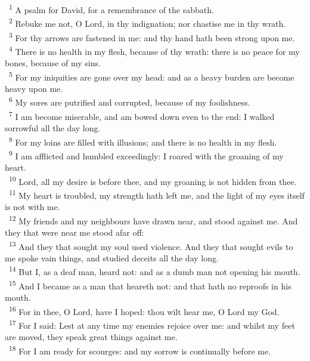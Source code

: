 \documentclass[a5paper,12pt]{article}
\begin{document}
\begin{multicols*}{2}
~\textsuperscript{1} A psalm for David, for a remembrance of the sabbath.\\
~\textsuperscript{2} Rebuke me not, O Lord, in thy indignation; nor chastise me in thy wrath.\\
~\textsuperscript{3} For thy arrows are fastened in me: and thy hand hath been strong upon me.\\
~\textsuperscript{4} There is no health in my flesh, because of thy wrath: there is no peace for my bones, because of my sins.\\
~\textsuperscript{5} For my iniquities are gone over my head: and as a heavy burden are become heavy upon me.\\
~\textsuperscript{6} My sores are putrified and corrupted, because of my foolishness.\\
~\textsuperscript{7} I am become miserable, and am bowed down even to the end: I walked sorrowful all the day long.\\
~\textsuperscript{8} For my loins are filled with illusions; and there is no health in my flesh.\\
~\textsuperscript{9} I am afflicted and humbled exceedingly: I roared with the groaning of my heart.\\
~\textsuperscript{10} Lord, all my desire is before thee, and my groaning is not hidden from thee.\\
~\textsuperscript{11} My heart is troubled, my strength hath left me, and the light of my eyes itself is not with me.\\
~\textsuperscript{12} My friends and my neighbours have drawn near, and stood against me. And they that were near me stood afar off:\\
~\textsuperscript{13} And they that sought my soul used violence. And they that sought evils to me spoke vain things, and studied deceits all the day long.\\
~\textsuperscript{14} But I, as a deaf man, heard not: and as a dumb man not opening his mouth.\\
~\textsuperscript{15} And I became as a man that heareth not: and that hath no reproofs in his mouth.\\
~\textsuperscript{16} For in thee, O Lord, have I hoped: thou wilt hear me, O Lord my God.\\
~\textsuperscript{17} For I said: Lest at any time my enemies rejoice over me: and whilst my feet are moved, they speak great things against me.\\
~\textsuperscript{18} For I am ready for scourges: and my sorrow is continually before me.\\

\end{multicols*}
\end{document}
